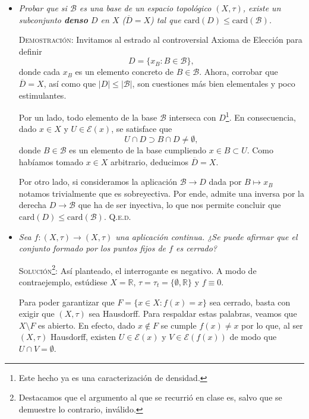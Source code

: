 \documentclass[11pt]{article}
\newcommand{\card}{\text{card}}
\begin{document}
\begin{itemize}
    \item[\boxed{3}] \emph{Probar que si $\mathcal{B}$ es una base de un espacio topológico $(X, \tau)$, existe un subconjunto \textbf{denso} $D$ en $X$ ($\overline{D} = X$) tal que $\card(D) \leq \card(\mathcal{B})$.}

    \vspace{5px}

    \textsc{Demostración}: Invitamos al estrado al controversial Axioma de Elección para definir \[D = \{x_B : B \in \mathcal{B}\},\] donde cada $x_B$ es un elemento concreto de $B \in \mathcal{B}$. Ahora, corrobar que $\overline{D} = X$, así como que $|D| \leq |\mathcal{B}|$, son cuestiones más bien elementales y poco estimulantes.
    
    Por un lado, todo elemento de la base $\mathcal{B}$ interseca con $D$\footnote{Este hecho ya es una caracterización de densidad.}. En consecuencia, dado $x \in X$ y $U \in \mathcal{E}(x)$, se satisface que \[U \cap D \supset B \cap D \neq \emptyset,\] donde $B \in \mathcal{B}$ es un elemento de la base cumpliendo $x \in B \subset U$. Como habíamos tomado $x \in X$ arbitrario, deducimos $\overline{D} = X$.

    Por otro lado, si consideramos la aplicación $\mathcal{B} \to D$ dada por $B \mapsto x_B$ notamos trivialmente que es sobreyectiva. Por ende, admite una inversa por la derecha $D \to \mathcal{B}$ que ha de ser inyectiva, lo que nos permite concluir que $\card(D) \leq \card(\mathcal{B})$. \hfill{\textsc{Q.e.d.}}

    \vspace{12px}

    \item[\boxed{9}] \textit{Sea $f : (X, \tau) \to (X, \tau)$ una aplicación continua. ¿Se puede afirmar que el conjunto formado por los puntos fijos de $f$ es cerrado?}

    \vspace{5px}

    \textsc{Solución}\footnote{Destacamos que el argumento al que se recurrió en clase es, salvo que se demuestre lo contrario, inválido.}: Así planteado, el interrogante es negativo. A modo de contraejemplo, estúdiese $X = \mathbb{R}$, $\tau = \tau_{t} = \{\emptyset, \mathbb{R}\}$ y $f \equiv 0$.

    Para poder garantizar que $F = \{x \in X : f(x) = x\}$ sea cerrado, basta con exigir que $(X, \tau)$ sea Hausdorff. Para respaldar estas palabras, veamos que $X \setminus F$ es abierto. En efecto, dado $x \notin F$ se cumple $f(x) \neq x$ por lo que, al ser $(X, \tau)$ Hausdorff, existen $U \in \mathcal{E}(x)$ y $V \in \mathcal{E}(f(x))$ de modo que $U \cap V = \emptyset$. 
    

\end{itemize}
\end{document}
